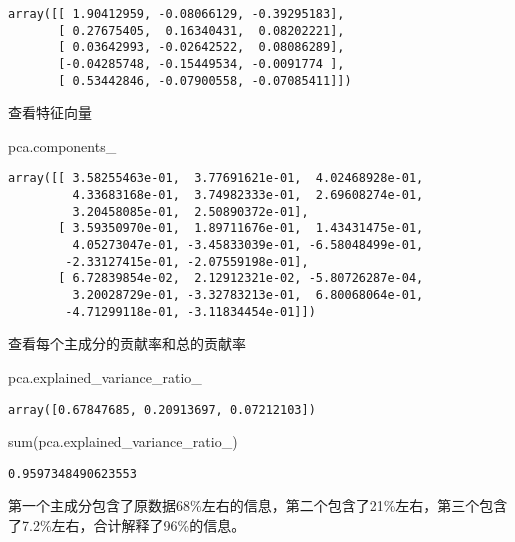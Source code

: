 \documentclass[
  letterpaper,
  DIV=11,
  numbers=noendperiod]{scrreprt}
\newenvironment{Shaded}{\begin{snugshade}}{\end{snugshade}}
\newcommand{\BuiltInTok}[1]{\textcolor[rgb]{0.00,0.23,0.31}{#1}}
\newcommand{\NormalTok}[1]{\textcolor[rgb]{0.00,0.23,0.31}{#1}}
\begin{document}
\begin{verbatim}
array([[ 1.90412959, -0.08066129, -0.39295183],
       [ 0.27675405,  0.16340431,  0.08202221],
       [ 0.03642993, -0.02642522,  0.08086289],
       [-0.04285748, -0.15449534, -0.0091774 ],
       [ 0.53442846, -0.07900558, -0.07085411]])
\end{verbatim}

查看特征向量

\begin{Shaded}
\begin{Highlighting}[]
\NormalTok{pca.components\_}
\end{Highlighting}
\end{Shaded}

\begin{verbatim}
array([[ 3.58255463e-01,  3.77691621e-01,  4.02468928e-01,
         4.33683168e-01,  3.74982333e-01,  2.69608274e-01,
         3.20458085e-01,  2.50890372e-01],
       [ 3.59350970e-01,  1.89711676e-01,  1.43431475e-01,
         4.05273047e-01, -3.45833039e-01, -6.58048499e-01,
        -2.33127415e-01, -2.07559198e-01],
       [ 6.72839854e-02,  2.12912321e-02, -5.80726287e-04,
         3.20028729e-01, -3.32783213e-01,  6.80068064e-01,
        -4.71299118e-01, -3.11834454e-01]])
\end{verbatim}

查看每个主成分的贡献率和总的贡献率

\begin{Shaded}
\begin{Highlighting}[]
\NormalTok{pca.explained\_variance\_ratio\_}
\end{Highlighting}
\end{Shaded}

\begin{verbatim}
array([0.67847685, 0.20913697, 0.07212103])
\end{verbatim}

\begin{Shaded}
\begin{Highlighting}[]
\BuiltInTok{sum}\NormalTok{(pca.explained\_variance\_ratio\_)}
\end{Highlighting}
\end{Shaded}

\begin{verbatim}
0.9597348490623553
\end{verbatim}

第一个主成分包含了原数据68\%左右的信息，第二个包含了21\%左右，第三个包含了7.2\%左右，合计解释了96\%的信息。
\end{document}
